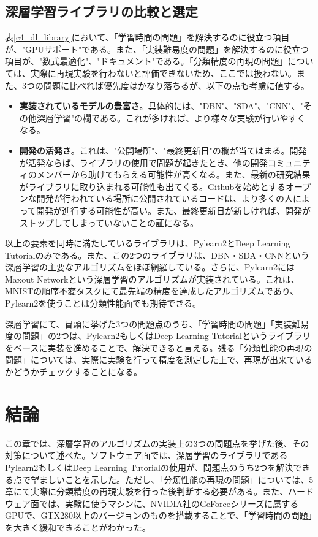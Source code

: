 \subsection{深層学習ライブラリの比較と選定}
表\ref{c4_dl_library}において、「学習時間の問題」を解決するのに役立つ項目が、"GPUサポート"である。また、「実装難易度の問題」を解決するのに役立つ項目が、"数式最適化"、"ドキュメント"である。「分類精度の再現の問題」については、実際に再現実験を行わないと評価できないため、ここでは扱わない。また、3つの問題に比べれば優先度はかなり落ちるが、以下の点も考慮に値する。
\begin{itemize}
\item \textbf{実装されているモデルの豊富さ}。具体的には、"DBN"、"SDA"、"CNN"、"その他深層学習"の欄である。これが多ければ、より様々な実験が行いやすくなる。
\item \textbf{開発の活発さ}。これは、"公開場所"、"最終更新日"の欄が当てはまる。開発が活発ならば、ライブラリの使用で問題が起きたとき、他の開発コミュニティのメンバーから助けてもらえる可能性が高くなる。また、最新の研究結果がライブラリに取り込まれる可能性も出てくる。Githubを始めとするオープンな開発が行われている場所に公開されているコードは、より多くの人によって開発が進行する可能性が高い。また、最終更新日が新しければ、開発がストップしてしまっていないことの証になる。
\end{itemize}
以上の要素を同時に満たしているライブラリは、Pylearn2とDeep Learning Tutorialのみである。また、この2つのライブラリは、DBN・SDA・CNNという深層学習の主要なアルゴリズムをほぼ網羅している。さらに、Pylearn2にはMaxout Networkという深層学習のアルゴリズムが実装されている。これは、MNISTの順序不変タスクにて最先端の精度を達成したアルゴリズムであり、Pylearn2を使うことは分類性能面でも期待できる。\par
深層学習にて、冒頭に挙げた3つの問題点のうち、「学習時間の問題」「実装難易度の問題」の2つは、Pylearn2もしくはDeep Learning Tutorialというライブラリをベースに実装を進めることで、解決できると言える。残る「分類性能の再現の問題」については、実際に実験を行って精度を測定した上で、再現が出来ているかどうかチェックすることになる。

\section{結論}
この章では、深層学習のアルゴリズムの実装上の3つの問題点を挙げた後、その対策について述べた。ソフトウェア面では、深層学習のライブラリであるPylearn2もしくはDeep Learning Tutorialの使用が、問題点のうち2つを解決できる点で望ましいことを示した。ただし、「分類性能の再現の問題」については、5章にて実際に分類精度の再現実験を行った後判断する必要がある。また、ハードウェア面では、実験に使うマシンに、NVIDIA社のGeForceシリーズに属するGPUで、GTX280以上のバージョンのものを搭載することで、「学習時間の問題」を大きく緩和できることがわかった。